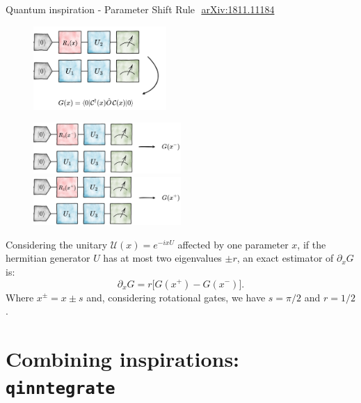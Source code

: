 \documentclass[8pt, xcolor={svgnames}, hyperref={linkcolor=black}]{beamer}
\begin{document}
\begin{frame}{Quantum inspiration - Parameter Shift Rule \hfill \faBook\,\,\href{https://arxiv.org/abs/1811.11184}{arXiv:1811.11184}}
\begin{multicols}{2}
\begin{figure}
    \includegraphics[width=0.45\textwidth]{figures/start.png}
\end{figure}
\pause
\begin{figure}  
    \includegraphics[width=0.5\textwidth]{figures/backward.png}
    \includegraphics[width=0.5\textwidth]{figures/forward.png}
\end{figure}
\end{multicols}

Considering the unitary $\mathcal{U}(x)=e^{-ix U}$ affected by one 
parameter $x$, if the hermitian generator $U$ has at most two eigenvalues $\pm r$,
an exact estimator of $\partial_{x}G$ is:
$$ \partial_x G = r \bigl[ G(x^+) - G(x^-) \bigr]. $$
Where $x^{\pm}=x\pm s$ and, considering rotational gates, we have $s=\pi/2$ and 
$r=1/2$.
\end{frame}

\section{Combining inspirations: \texttt{qinntegrate}}
\end{document}
